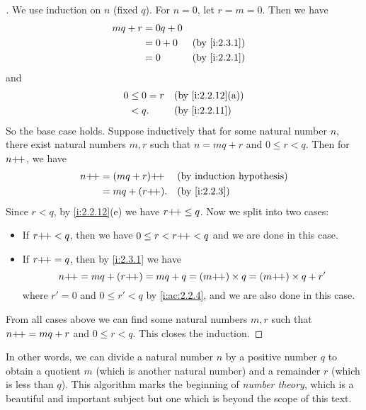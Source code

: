 \begin{proof}[]
  We use induction on \(n\) (fixed \(q\)).
  For \(n = 0\), let \(r = m = 0\).
  Then we have
  \begin{align*}
    mq + r & = 0q + 0                   \\
           & = 0 + 0  &  & \by{i:2.3.1} \\
           & = 0      &  & \by{i:2.2.1}
  \end{align*}
  and
  \begin{align*}
    0 & \leq 0 = r &  & \by{i:2.2.12}[a] \\
      & < q.       &  & \by{i:2.2.11}
  \end{align*}
  So the base case holds.
  Suppose inductively that for some natural number \(n\), there exist natural numbers \(m, r\) such that \(n = mq + r\) and \(0 \leq r < q\).
  Then for \(n{+}\!{+}\), we have
  \begin{align*}
    n\pp & = (mq + r)\pp  &  & \byIH        \\
         & = mq + (r\pp). &  & \by{i:2.2.3} \\
  \end{align*}
  Since \(r < q\), by \cref{i:2.2.12}(e) we have \(r{+}\!{+} \leq q\).
  Now we split into two cases:
  \begin{itemize}
    \item If \(r{+}\!{+} < q\), then we have \(0 \leq r < r{+}\!{+} < q\) and we are done in this case.
    \item If \(r{+}\!{+} = q\), then by \cref{i:2.3.1} we have
          \[
            n{+}\!{+} = mq + (r{+}\!{+}) = mq + q = (m{+}\!{+}) \times q = (m{+}\!{+}) \times q + r'
          \]
          where \(r' = 0\) and \(0 \leq r' < q\) by \cref{i:ac:2.2.4}, and we are also done in this case.
  \end{itemize}
  From all cases above we can find some natural numbers \(m, r\) such that \(n{+}\!{+} = mq + r\) and \(0 \leq r < q\).
  This closes the induction.
\end{proof}

\begin{rmk}\label{i:2.3.10}
  In other words, we can divide a natural number \(n\) by a positive number \(q\) to obtain a quotient \(m\) (which is another natural number) and a remainder \(r\) (which is less than \(q\)).
  This algorithm marks the beginning of \emph{number theory}, which is a beautiful and important subject but one which is beyond the scope of this text.
\end{rmk}


